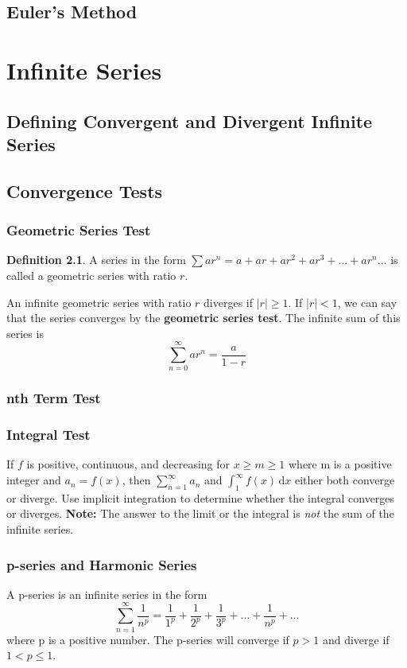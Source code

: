 \documentclass[letterpaper]{report}
\theoremstyle{definition}
\newtheorem{definition}{Definition}
\begin{document}
\section{Euler's Method}


\chapter{Infinite Series}

\section{Defining Convergent and Divergent Infinite Series}

\section{Convergence Tests}

\subsection{Geometric Series Test}
\begin{definition}
A series in the form $\sum{ar^n} = a + ar + ar^2 + ar^3 + ... + ar^n ...$
is called a geometric series with ratio $r$.
\end{definition}
An infinite geometric series with ratio $r$ diverges if $|r|\geq1$.
If $|r|<1$, we can say that the series converges by the 
\textbf{geometric series test}. The infinite sum of this series is
\[ \sum_{n=0}^\infty ar^n = \frac{a}{1-r} \]

\subsection{nth Term Test}

\subsection{Integral Test}
If $f$ is positive, continuous, and decreasing for $x\geq{}m\geq{}1$ where
m is a positive integer and $a_n=f(x)$, then $\sum_{n=1}^\infty a_n$ and
$\int_1^\infty f(x) \, \mathrm{d}x$ either both converge or diverge.
Use implicit integration to determine whether the integral converges or diverges.
\textbf{Note:} The answer to the limit or the integral is \textit{not} the 
sum of the infinite series.

\subsection{p-series and Harmonic Series}
A p-series is an infinite series in the form
\[ \sum_{n=1}^\infty \frac{1}{n^p}=\frac{1}{1^p}+\frac{1}{2^p}
    +\frac{1}{3^p}+...+\frac{1}{n^p}+... \]
where p is a positive number.
The p-series will converge if $p>1$ and diverge if $1<p\leq1$.
\end{document}
